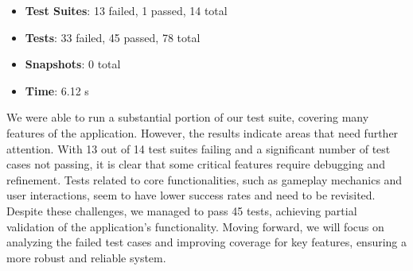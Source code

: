 \begin{itemize}
    \item \textbf{Test Suites}: 13 failed, 1 passed, 14 total
    \item \textbf{Tests}: 33 failed, 45 passed, 78 total
    \item \textbf{Snapshots}: 0 total
    \item \textbf{Time}: 6.12 s
\end{itemize}

\noindent We were able to run a substantial portion of our test suite, covering many features of the application. However, the results indicate areas that need further attention. With 13 out of 14 test suites failing and a significant number of test cases not passing, it is clear that some critical features require debugging and refinement. Tests related to core functionalities, such as gameplay mechanics and user interactions, seem to have lower success rates and need to be revisited. Despite these challenges, we managed to pass 45 tests, achieving partial validation of the application’s functionality. Moving forward, we will focus on analyzing the failed test cases and improving coverage for key features, ensuring a more robust and reliable system.
\pagebreak
